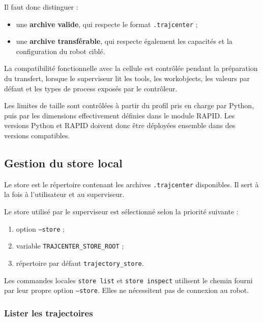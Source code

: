 \documentclass{rapportENSAM}
\begin{document}
Il faut donc distinguer :

\begin{itemize}
    \item une \textbf{archive valide}, qui respecte le format
    \texttt{.trajcenter} ;
    \item une \textbf{archive transférable}, qui respecte également les
    capacités et la configuration du robot ciblé.
\end{itemize}

La compatibilité fonctionnelle avec la cellule est contrôlée pendant la préparation du transfert, lorsque le superviseur lit les tools, les workobjects, les valeurs par défaut et les types de process exposés par le contrôleur.

Les limites de taille sont contrôlées à partir du profil pris en charge par Python, puis par les dimensions effectivement définies dans le module RAPID. Les versions Python et RAPID doivent donc être déployées ensemble dans des versions compatibles.




\subsection{Gestion du store local}
\label{subsec:pc-store}

Le store est le répertoire contenant les archives \texttt{.trajcenter}
disponibles. Il sert à la fois à l'utilisateur et au superviseur.

Le store utilisé par le superviseur est sélectionné selon la priorité suivante :

\begin{enumerate}
    \item option \texttt{--store} ;
    \item variable \texttt{TRAJCENTER\_STORE\_ROOT} ;
    \item répertoire par défaut \texttt{trajectory\_store}.
\end{enumerate}

Les commandes locales \texttt{store list} et \texttt{store inspect}
utilisent le chemin fourni par leur propre option \texttt{--store}. Elles ne
nécessitent pas de connexion au robot.

\subsubsection{Lister les trajectoires}
\label{subsubsec:pc-store-list}
\end{document}
